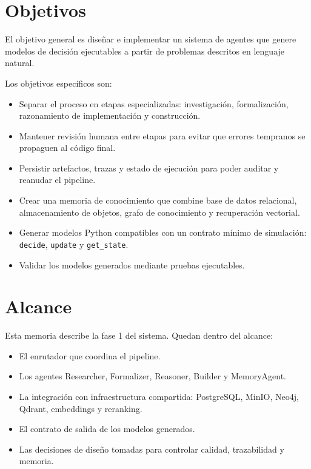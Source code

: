 \section{Objetivos}

El objetivo general es diseñar e implementar un sistema de agentes que genere
modelos de decisión ejecutables a partir de problemas descritos en lenguaje
natural.

Los objetivos específicos son:

\begin{itemize}
\item Separar el proceso en etapas especializadas: investigación, formalización,
razonamiento de implementación y construcción.
\item Mantener revisión humana entre etapas para evitar que errores tempranos se
propaguen al código final.
\item Persistir artefactos, trazas y estado de ejecución para poder auditar y
reanudar el pipeline.
\item Crear una memoria de conocimiento que combine base de datos relacional,
almacenamiento de objetos, grafo de conocimiento y recuperación vectorial.
\item Generar modelos Python compatibles con un contrato mínimo de simulación:
\texttt{decide}, \texttt{update} y \texttt{get\_state}.
\item Validar los modelos generados mediante pruebas ejecutables.
\end{itemize}

\section{Alcance}

Esta memoria describe la fase 1 del sistema. Quedan dentro del alcance:

\begin{itemize}
\item El enrutador que coordina el pipeline.
\item Los agentes Researcher, Formalizer, Reasoner, Builder y MemoryAgent.
\item La integración con infraestructura compartida: PostgreSQL, MinIO, Neo4j,
Qdrant, embeddings y reranking.
\item El contrato de salida de los modelos generados.
\item Las decisiones de diseño tomadas para controlar calidad, trazabilidad y
memoria.
\end{itemize}

